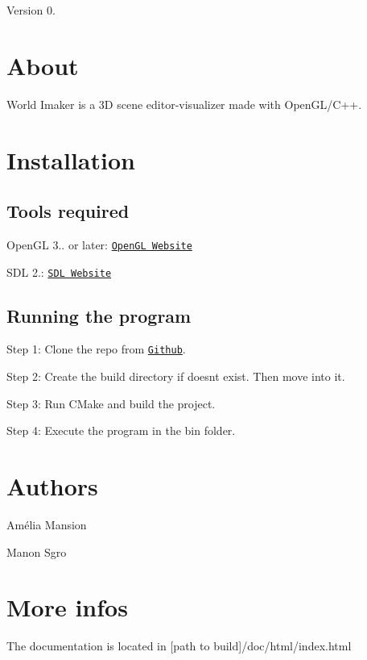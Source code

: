\begin{DoxyVersion}{Version}
0. 
\end{DoxyVersion}
\hypertarget{index_intro_sec}{}\section{About}\label{index_intro_sec}
World Imaker is a 3D scene editor-\/visualizer made with Open\+G\+L/\+C++.\hypertarget{index_install_sec}{}\section{Installation}\label{index_install_sec}
\hypertarget{index_tools_subsec}{}\subsection{Tools required}\label{index_tools_subsec}

\begin{DoxyItemize}
\item Open\+GL 3.. or later\+: 
\footnotesize \href{https://www.opengl.org/}{\tt Open\+GL Website}
\normalsize 
\item S\+DL 2.\+: 
\footnotesize \href{https://www.libsdl.org/}{\tt S\+DL Website}
\normalsize 
\end{DoxyItemize}\hypertarget{index_running}{}\subsection{Running the program}\label{index_running}

\begin{DoxyItemize}
\item Step 1\+: Clone the repo from \href{https://github.com/ManonSgro/World_Imaker.git}{\tt Github}.
\item Step 2\+: Create the build directory if doesn\textquotesingle{}t exist. Then move into it.
\item Step 3\+: Run C\+Make and build the project.
\item Step 4\+: Execute the program in the {\ttfamily bin} folder.
\end{DoxyItemize}\hypertarget{index_authors}{}\section{Authors}\label{index_authors}

\begin{DoxyItemize}
\item Amélia Mansion
\item Manon Sgro\textquotesingle{}
\end{DoxyItemize}\hypertarget{index_footer}{}\section{More infos}\label{index_footer}
The documentation is located in {\ttfamily \mbox{[}path to build\mbox{]}/doc/html/index.html} 